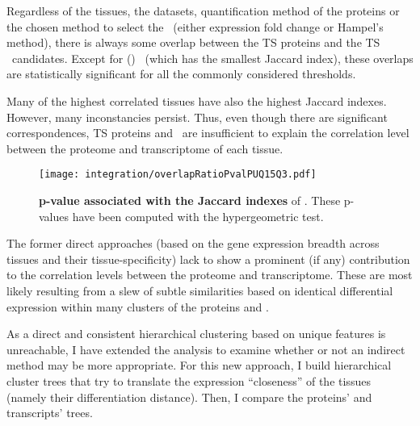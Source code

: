 Regardless of the tissues, the datasets, quantification method of the proteins
or the chosen method to select the \mRNAs\
(either expression fold change or Hampel's method),
there is always some overlap between
the \gls{TS} proteins and the \gls{TS} \mRNAs\ candidates.
Except for () \bladder\ (which has the smallest Jaccard index),
these overlaps are statistically significant
for all the commonly considered thresholds.

\vspace{-2mm}
Many of the highest correlated tissues have also the highest Jaccard indexes.
However, many inconstancies persist.
Thus, even though there are significant correspondences,
\gls{TS} proteins and \mRNAs\ are insufficient to explain
the correlation level between the proteome and transcriptome of each tissue.
\vspace{-\baselineskip}

\begin{figure}[!htb]
    \texttt{[image: integration/overlapRatioPvalPUQ15Q3.pdf]}\centering
    \vspace{1mm}
    \caption[p-values associated with the Jaccard indexes]{\label{fig:JaccardPvalues}\label{fig:pJacquard}%
    \textbf{p-value associated with the Jaccard indexes} of \Cref{fig:JaccardIndexes}.
    These p-values have been computed with the hypergeometric test.}
    \vspace{-3mm}
\end{figure}

The former direct approaches
(based on the gene expression breadth across tissues and their tissue-specificity)
lack to show a prominent (if any) contribution to the correlation levels
between the proteome and transcriptome.
These are most likely resulting
from a slew of subtle similarities
based on identical differential expression
within many clusters of the proteins and \mRNAs{}.%

As a direct and consistent hierarchical clustering
based on unique features is unreachable,
I have extended the analysis to examine whether or not an indirect method
may be more appropriate.
For this new approach,
I build hierarchical cluster trees that try to translate
the expression \enquote{closeness} of the tissues
(namely their differentiation distance).
Then, I compare the proteins' and transcripts' trees.\\
\vspace{-\baselineskip}

